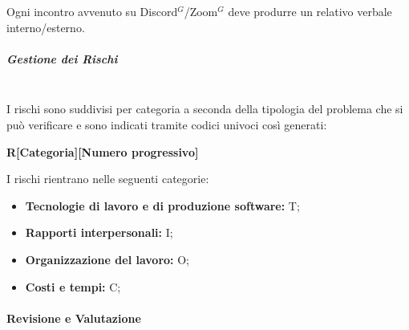 Ogni incontro avvenuto su Discord$^{G}$/Zoom$^{G}$ deve produrre un relativo verbale interno/esterno.

\subparagraph{Gestione dei Rischi}
\mbox{}\\
I rischi sono suddivisi per categoria a seconda della tipologia del problema che si può verificare e
sono indicati tramite codici univoci così generati:

\begin{center}
    \textbf{R[Categoria][Numero progressivo]}
\end{center}

I rischi rientrano nelle seguenti categorie:
\begin{itemize}
    \item \textbf{Tecnologie di lavoro e di produzione software:} T;
    \item \textbf{Rapporti interpersonali:} I;
    \item \textbf{Organizzazione del lavoro:} O;
    \item \textbf{Costi e tempi:} C;
\end{itemize}


\paragraph{Revisione e Valutazione}

